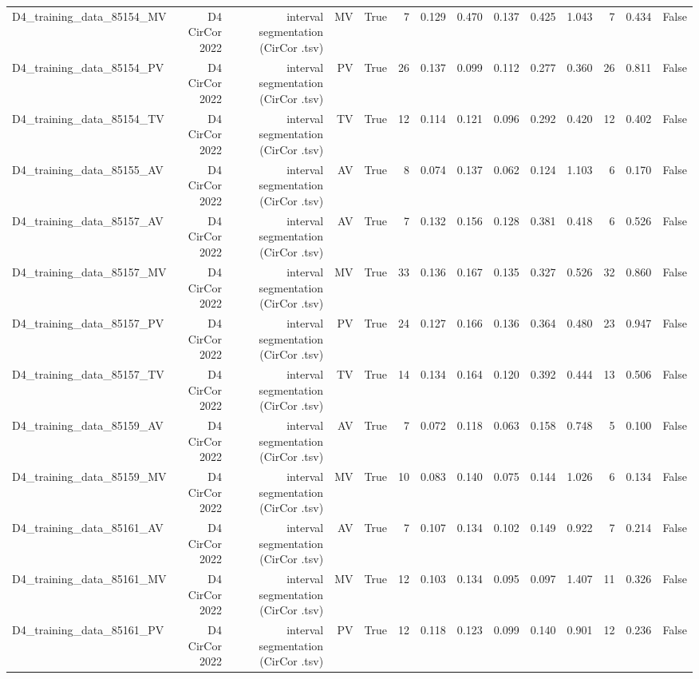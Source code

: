 \begin{table}[htbp]
\begin{tabular}{lrrrrrrrrrrrrr}
    D4\_training\_data\_85154\_MV & D4 CirCor 2022 & interval segmentation (CirCor .tsv) & MV & True & 7 & 0.129 & 0.470 & 0.137 & 0.425 & 1.043 & 7 & 0.434 & False \\
    D4\_training\_data\_85154\_PV & D4 CirCor 2022 & interval segmentation (CirCor .tsv) & PV & True & 26 & 0.137 & 0.099 & 0.112 & 0.277 & 0.360 & 26 & 0.811 & False \\
    D4\_training\_data\_85154\_TV & D4 CirCor 2022 & interval segmentation (CirCor .tsv) & TV & True & 12 & 0.114 & 0.121 & 0.096 & 0.292 & 0.420 & 12 & 0.402 & False \\
    D4\_training\_data\_85155\_AV & D4 CirCor 2022 & interval segmentation (CirCor .tsv) & AV & True & 8 & 0.074 & 0.137 & 0.062 & 0.124 & 1.103 & 6 & 0.170 & False \\
    D4\_training\_data\_85157\_AV & D4 CirCor 2022 & interval segmentation (CirCor .tsv) & AV & True & 7 & 0.132 & 0.156 & 0.128 & 0.381 & 0.418 & 6 & 0.526 & False \\
    D4\_training\_data\_85157\_MV & D4 CirCor 2022 & interval segmentation (CirCor .tsv) & MV & True & 33 & 0.136 & 0.167 & 0.135 & 0.327 & 0.526 & 32 & 0.860 & False \\
    D4\_training\_data\_85157\_PV & D4 CirCor 2022 & interval segmentation (CirCor .tsv) & PV & True & 24 & 0.127 & 0.166 & 0.136 & 0.364 & 0.480 & 23 & 0.947 & False \\
    D4\_training\_data\_85157\_TV & D4 CirCor 2022 & interval segmentation (CirCor .tsv) & TV & True & 14 & 0.134 & 0.164 & 0.120 & 0.392 & 0.444 & 13 & 0.506 & False \\
    D4\_training\_data\_85159\_AV & D4 CirCor 2022 & interval segmentation (CirCor .tsv) & AV & True & 7 & 0.072 & 0.118 & 0.063 & 0.158 & 0.748 & 5 & 0.100 & False \\
    D4\_training\_data\_85159\_MV & D4 CirCor 2022 & interval segmentation (CirCor .tsv) & MV & True & 10 & 0.083 & 0.140 & 0.075 & 0.144 & 1.026 & 6 & 0.134 & False \\
    D4\_training\_data\_85161\_AV & D4 CirCor 2022 & interval segmentation (CirCor .tsv) & AV & True & 7 & 0.107 & 0.134 & 0.102 & 0.149 & 0.922 & 7 & 0.214 & False \\
    D4\_training\_data\_85161\_MV & D4 CirCor 2022 & interval segmentation (CirCor .tsv) & MV & True & 12 & 0.103 & 0.134 & 0.095 & 0.097 & 1.407 & 11 & 0.326 & False \\
    D4\_training\_data\_85161\_PV & D4 CirCor 2022 & interval segmentation (CirCor .tsv) & PV & True & 12 & 0.118 & 0.123 & 0.099 & 0.140 & 0.901 & 12 & 0.236 & False \\

\end{tabular}
\end{table}
